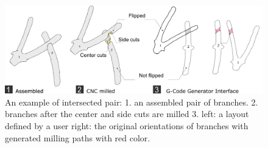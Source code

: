 \begin{figure}[ht]
  \begin{center}
    \includegraphics[width = 0.4\paperwidth]{images/system/joint_milling_diagram_4.png}
    \caption{An example of intersected pair: 1. an assembled pair of branches. 2. branches after the center and side cuts are milled 3. left: a layout defined by a user right: the original orientations of branches with generated milling paths with red color.  }
    \label{fig:joint_geometry}
  \end{center}
\end{figure}


